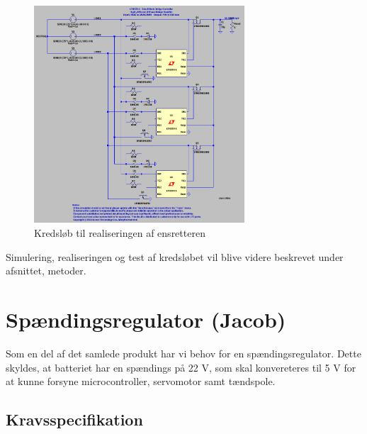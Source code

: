 \begin{figure}[h]
  \centering
  \includegraphics[width=0.7\textwidth]{./figurer/prens4.png}
  \caption{Kredsløb til realiseringen af ensretteren}
  \label{fig:prens2}
\end{figure}

Simulering, realiseringen og test af kredsløbet vil blive videre beskrevet under afsnittet, metoder.


\section{Spændingsregulator (Jacob)}
\label{sec:spandingsforstarker}

Som en del af det samlede produkt har vi behov for en spændingsregulator. Dette skyldes, at batteriet har en spændings på 22 V, som skal konvereteres til 5 V for at kunne forsyne microcontroller, servomotor samt tændspole. %

\subsection{Kravsspecifikation}
\label{sec:kravsspecifikation-2}

